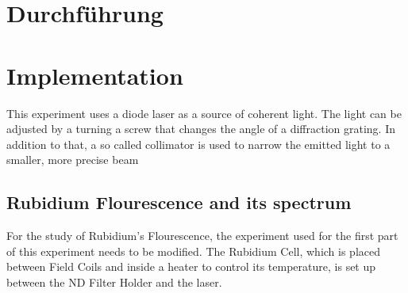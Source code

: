 \section{Durchführung}
\label{sec:Durchführung}

\section{Implementation}
\label{sec:implementation}
This experiment uses a diode laser as a source of coherent light. The light can be adjusted by a turning a screw that changes the angle of a diffraction grating. 
In addition to that, a so called collimator is used to narrow the emitted light to a smaller, more precise beam  


\subsection{Rubidium Flourescence and its spectrum}
\label{sec:Rubi}
For the study of Rubidium's Flourescence, the experiment used for the first part of this experiment needs to be modified.
The Rubidium Cell, which is placed between Field Coils and inside a heater to control its temperature, is set up between the ND Filter Holder and the laser.

